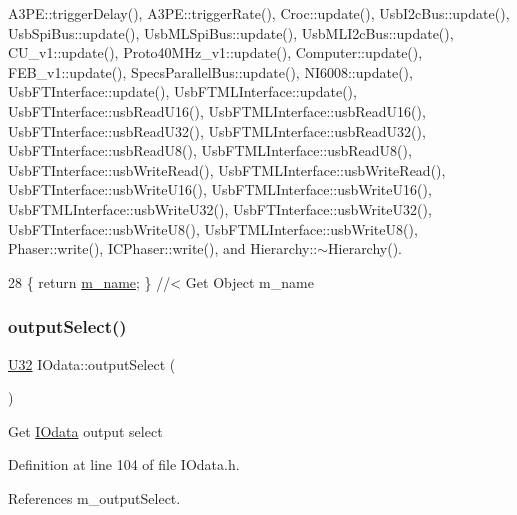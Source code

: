 A3\+P\+E\+::trigger\+Delay(), A3\+P\+E\+::trigger\+Rate(), Croc\+::update(), Usb\+I2c\+Bus\+::update(), Usb\+Spi\+Bus\+::update(), Usb\+M\+L\+Spi\+Bus\+::update(), Usb\+M\+L\+I2c\+Bus\+::update(), C\+U\+\_\+v1\+::update(), Proto40\+M\+Hz\+\_\+v1\+::update(), Computer\+::update(), F\+E\+B\+\_\+v1\+::update(), Specs\+Parallel\+Bus\+::update(), N\+I6008\+::update(), Usb\+F\+T\+Interface\+::update(), Usb\+F\+T\+M\+L\+Interface\+::update(), Usb\+F\+T\+Interface\+::usb\+Read\+U16(), Usb\+F\+T\+M\+L\+Interface\+::usb\+Read\+U16(), Usb\+F\+T\+Interface\+::usb\+Read\+U32(), Usb\+F\+T\+M\+L\+Interface\+::usb\+Read\+U32(), Usb\+F\+T\+Interface\+::usb\+Read\+U8(), Usb\+F\+T\+M\+L\+Interface\+::usb\+Read\+U8(), Usb\+F\+T\+Interface\+::usb\+Write\+Read(), Usb\+F\+T\+M\+L\+Interface\+::usb\+Write\+Read(), Usb\+F\+T\+Interface\+::usb\+Write\+U16(), Usb\+F\+T\+M\+L\+Interface\+::usb\+Write\+U16(), Usb\+F\+T\+M\+L\+Interface\+::usb\+Write\+U32(), Usb\+F\+T\+Interface\+::usb\+Write\+U32(), Usb\+F\+T\+Interface\+::usb\+Write\+U8(), Usb\+F\+T\+M\+L\+Interface\+::usb\+Write\+U8(), Phaser\+::write(), I\+C\+Phaser\+::write(), and Hierarchy\+::$\sim$\+Hierarchy().


\begin{DoxyCode}
28 \{ \textcolor{keywordflow}{return} \hyperlink{classObject_a8b83c95c705d2c3ba0d081fe1710f48d}{m\_name}; \} \textcolor{comment}{//< Get Object m\_name}
\end{DoxyCode}
\mbox{\label{classIOdata_aaa410b57a4607857d45ac6a7cd013307}} 
\subsubsection{\texorpdfstring{output\+Select()}{outputSelect()}}
{\footnotesize\ttfamily \hyperlink{classIOdata_a96fb57f5fcd87b708743abd3c86a5198}{U32} I\+Odata\+::output\+Select (\begin{DoxyParamCaption}{ }\end{DoxyParamCaption})\hspace{0.3cm}{\ttfamily [inline]}}

Get \hyperlink{classIOdata}{I\+Odata} output select 

Definition at line 104 of file I\+Odata.\+h.



References m\+\_\+output\+Select.



